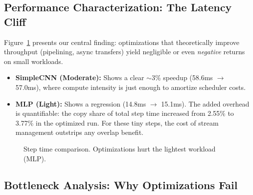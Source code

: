 \documentclass[10pt,twocolumn,letterpaper]{article}
\begin{document}
\subsection{Performance Characterization: The Latency Cliff}

Figure~\ref{fig:steptime} presents our central finding: optimizations that theoretically improve throughput (pipelining, async transfers) yield negligible or even \emph{negative} returns on small workloads.
\begin{itemize}[nosep,leftmargin=*]
    \item \textbf{SimpleCNN (Moderate):} Shows a clear $\sim$3\% speedup (58.6ms $\to$ 57.0ms), where compute intensity is just enough to amortize scheduler costs.
    \item \textbf{MLP (Light):} Shows a regression (14.8ms $\to$ 15.1ms). The added overhead is quantifiable: the copy share of total step time increased from 2.55\% to 3.77\% in the optimized run. For these tiny steps, the cost of stream management outstrips any overlap benefit.
\end{itemize}

\begin{figure}[H]
\centering
{}
\caption{Step time comparison. Optimizations hurt the lightest workload (MLP).}
\label{fig:steptime}
\end{figure}

\subsection{Bottleneck Analysis: Why Optimizations Fail}
\end{document}
